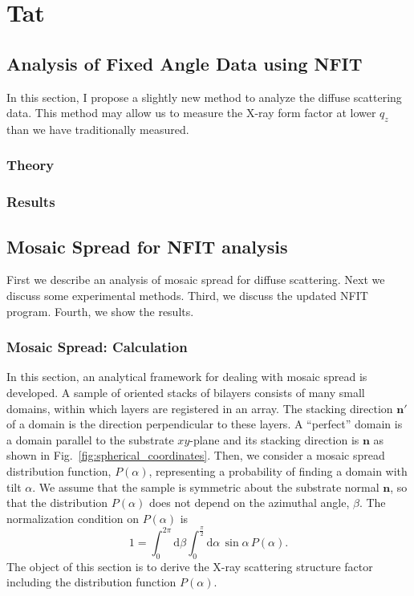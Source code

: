 \chapter{Tat}
\section{Analysis of Fixed Angle Data using NFIT}\label{sec:fixed_angle_analysis}
In this section, I propose a slightly new method to analyze the diffuse 
scattering data. This method may allow us to measure the X-ray form factor
at lower $q_z$ than we have traditionally measured. 

\subsection{Theory}

\subsection{Results}

\section{Mosaic Spread for NFIT analysis}
\label{sec:mosaic_spread}
First we describe an analysis of mosaic spread for diffuse scattering. 
Next we discuss some experimental methods. Third, we discuss the updated NFIT program.
Fourth, we show the results.

\subsection{Mosaic Spread: Calculation}
In this section, an analytical framework for dealing with mosaic spread is 
developed. A sample of oriented stacks of bilayers consists of many small domains, 
within which layers are registered in an array. The stacking direction $\mathbf{n'}$ of a domain is the 
direction perpendicular to these layers. 
A ``perfect'' domain is a domain parallel to the substrate $xy$-plane and 
its stacking direction is $\mathbf{n}$ as shown in Fig.~\ref{fig:spherical_coordinates}.
Then, we consider a mosaic spread distribution function, $P(\alpha)$, 
representing a probability of finding a domain with tilt $\alpha$. 
We assume that the sample is symmetric about the substrate normal $\mathbf{n}$, 
so that the distribution $P(\alpha)$ does not depend on the azimuthal angle, $\beta$. 
The normalization condition on $P(\alpha)$ is 
\begin{equation}
  1 = \int_0^{2\pi} \!\! \mathrm{d}\beta  
      \int_0^{\frac{\pi}{2}} \! \mathrm{d}\alpha \, \sin\alpha \, P(\alpha).
\end{equation}
The object of this section is to derive the X-ray scattering structure factor 
including the distribution function $P(\alpha)$. 


